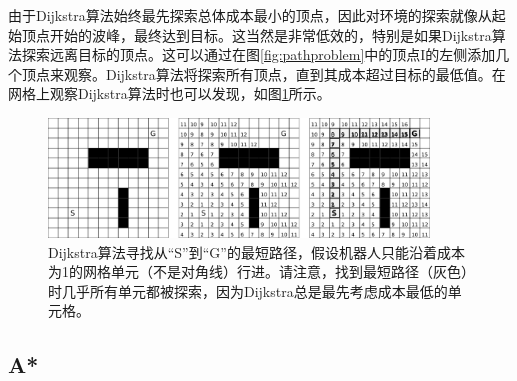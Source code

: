 由于Dijkstra算法始终最先探索总体成本最小的顶点，因此对环境的探索就像从起始顶点开始的波峰，最终达到目标。这当然是非常低效的，特别是如果Dijkstra算法探索远离目标的顶点。这可以通过在图\ref{fig:pathproblem}中的顶点I的左侧添加几个顶点来观察。Dijkstra算法将探索所有顶点，直到其成本超过目标的最低值。在网格上观察Dijkstra算法时也可以发现，如图\ref{fig:dijkstragrid}所示。

\begin{figure}[htb]
\centering
\includegraphics[width=0.9\textwidth]{figs/dijkstragrid}
\caption{Dijkstra算法寻找从“S”到“G”的最短路径，假设机器人只能沿着成本为1的网格单元（不是对角线）行进。请注意，找到最短路径（灰色）时几乎所有单元都被探索，因为Dijkstra总是最先考虑成本最低的单元格。\label{fig:dijkstragrid}}
\end{figure}

\subsection{A*}\label{sec:astar}

